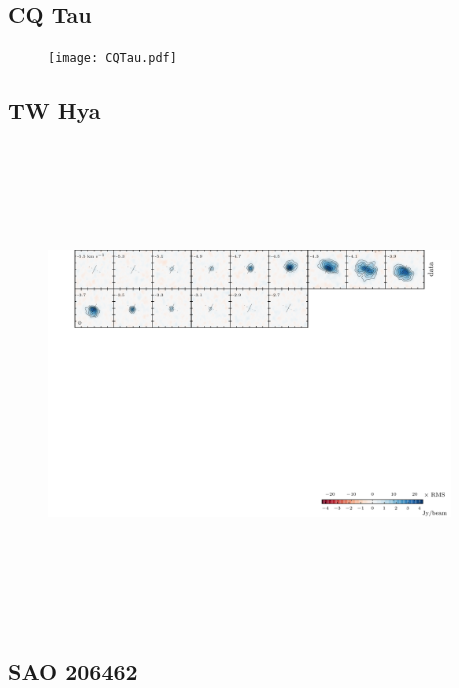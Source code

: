 \documentclass[twocolumn]{aastex6}
\begin{document}
\subsection{CQ Tau}

\begin{figure}[htb]
\begin{center}
  \texttt{[image: CQTau.pdf]}
  \end{center}
\end{figure}

\subsection{TW Hya}

\begin{figure}[htb]
\begin{center}
  \includegraphics[draft, width=0.95\textwidth, height=5in]{TWHya.pdf}
  \end{center}
\end{figure}

\subsection{SAO 206462}
\end{document}
